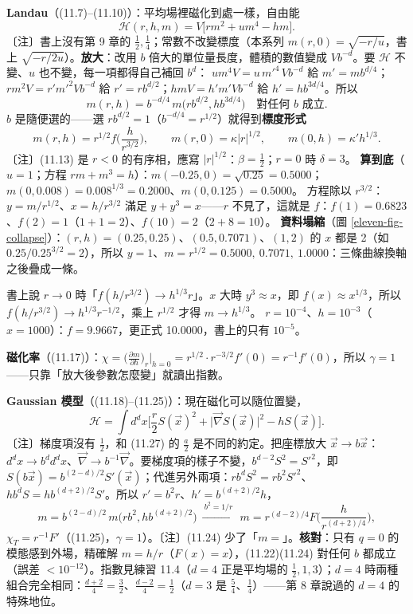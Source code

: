 \textbf{Landau}（(11.7)--(11.10)）：平均場裡磁化到處一樣，自由能
\[\mathcal H(r,h,m)=V\big[rm^2+um^4-hm\big].\tag{11.9}\]
〔注〕書上沒有第 9 章的 $\frac12,\frac14$；常數不改變標度（本系列 $m(r,0)=\sqrt{-r/u}$，書上 $\sqrt{-r/2u}$）。\textbf{放大}：改用 $b$ 倍大的單位量長度，體積的數值變成 $Vb^{-d}$。要 $\mathcal H$ 不變、$u$ 也不變，每一項都得自己補回 $b^d$：
$um^4V=u\,m'^4\,Vb^{-d}$ 給 $m'=mb^{d/4}$；$rm^2V=r'm'^2Vb^{-d}$ 給 $r'=rb^{d/2}$；$hmV=h'm'Vb^{-d}$ 給 $h'=hb^{3d/4}$。所以
\[m(r,h)=b^{-d/4}\,m\big(rb^{d/2},hb^{3d/4}\big)\quad\text{對任何 }b\text{ 成立}.\tag{11.11}\]
$b$ 是隨便選的——選 $rb^{d/2}=1$（$b^{-d/4}=r^{1/2}$）就得到\textbf{標度形式}
\[m(r,h)=r^{1/2}f\Big(\frac h{r^{3/2}}\Big),\qquad m(r,0)=\kappa|r|^{1/2},\qquad m(0,h)=\kappa'h^{1/3}.\tag{11.12--11.16}\]
〔注〕(11.13) 是 $r<0$ 的有序相，應寫 $|r|^{1/2}$：$\beta=\frac12$；$r=0$ 時 $\delta=3$。
\textbf{算到底}（$u=1$；方程 $rm+m^3=h$）：$m(-0.25,0)=\sqrt{0.25}=0.5000$；$m(0,0.008)=0.008^{1/3}=0.2000$、$m(0,0.125)=0.5000$。
方程除以 $r^{3/2}$：$y=m/r^{1/2}$、$x=h/r^{3/2}$ 滿足 $y+y^3=x$——$r$ 不見了，這就是 $f$：$f(1)=0.6823$、$f(2)=1$（$1+1=2$）、$f(10)=2$（$2+8=10$）。
\textbf{資料塌縮}（圖 \ref{eleven-fig-collapse}）：$(r,h)=(0.25,0.25)$、$(0.5,0.7071)$、$(1,2)$ 的 $x$ 都是 2（如 $0.25/0.25^{3/2}=2$），所以 $y=1$、$m=r^{1/2}=0.5000,\ 0.7071,\ 1.0000$：三條曲線換軸之後疊成一條。
\begin{errbox}[p.~263，(11.16) 後]
書上說 $r\to0$ 時「$f(h/r^{3/2})\to h^{1/3}r$」。$x$ 大時 $y^3\approx x$，即 $f(x)\approx x^{1/3}$，所以 $f(h/r^{3/2})\to h^{1/3}r^{-1/2}$，乘上 $r^{1/2}$ 才得 $m\to h^{1/3}$。
$r=10^{-4}$、$h=10^{-3}$（$x=1000$）：$f=9.9667$，更正式 10.0000，書上的只有 $10^{-5}$。
\end{errbox}
\textbf{磁化率}（(11.17)）：$\chi=\big(\frac{\partial m}{\partial h}\big)_r\big|_{h=0}=r^{1/2}\cdot r^{-3/2}f'(0)=r^{-1}f'(0)$，所以 $\gamma=1$——只靠「放大後參數怎麼變」就讀出指數。

\textbf{Gaussian 模型}（(11.18)--(11.25)）：現在磁化可以隨位置變，
\[\mathcal H=\int d^dx\Big[\frac r2S(\vec x)^2+\big|\vec\nabla S(\vec x)\big|^2-hS(\vec x)\Big].\tag{11.18}\]
〔注〕梯度項沒有 $\frac12$，和 (11.27) 的 $\frac a2$ 是不同的約定。把座標放大 $\vec x\to b\vec x$：$d^dx\to b^dd^dx$、$\vec\nabla\to b^{-1}\vec\nabla$。要梯度項的樣子不變，$b^{d-2}S^2=S'^2$，即
$S(b\vec x)=b^{(2-d)/2}S'(\vec x)$；代進另外兩項：$rb^dS^2=rb^2S'^2$、$hb^dS=hb^{(d+2)/2}S'$。所以 $r'=b^2r$、$h'=b^{(d+2)/2}h$，
\[m=b^{(2-d)/2}\,m\big(rb^2,hb^{(d+2)/2}\big)\ \xrightarrow{\ b^2=1/r\ }\ m=r^{(d-2)/4}F\Big(\frac h{r^{(d+2)/4}}\Big),\tag{11.19--11.24}\]
$\chi_T=r^{-1}F'$（(11.25)，$\gamma=1$）。〔注〕(11.24) 少了「$m=$」。\textbf{核對}：只有 $q=0$ 的模態感到外場，精確解 $m=h/r$（$F(x)=x$），(11.22)(11.24) 對任何 $b$ 都成立（誤差 $<10^{-12}$）。指數見練習 11.4（$d=4$ 正是平均場的 $\frac12,1,3$）；$d=4$ 時兩種組合完全相同：$\frac{d+2}4=\frac32$、$\frac{d-2}4=\frac12$（$d=3$ 是 $\frac54$、$\frac14$）——第 8 章說過的 $d=4$ 的特殊地位。

